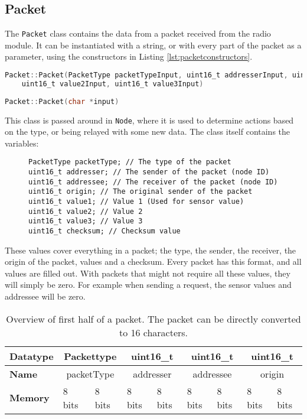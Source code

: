 \subsection{Packet}
The \texttt{Packet} class contains the data from a packet received from the radio module. It can be instantiated with a string, or with every part of the packet as a parameter, using the constructors in Listing \ref{lst:packetconstructors}.
\begin{lstlisting}[language=C,label={lst:packetconstructors},caption={Packet constructors}]
Packet::Packet(PacketType packetTypeInput, uint16_t addresserInput, uint16_t addresseeInput, uint16_t originInput, uint16_t value1Input,
	uint16_t value2Input, uint16_t value3Input)
	
Packet::Packet(char *input)
\end{lstlisting}


This class is passed around in \texttt{Node}, where it is used to determine actions based on the type, or being relayed with some new data. 
The class itself contains the variables:
\begin{figure}
\begin{lstlisting}
PacketType packetType; // The type of the packet
uint16_t addresser; // The sender of the packet (node ID)
uint16_t addressee; // The receiver of the packet (node ID)
uint16_t origin; // The original sender of the packet
uint16_t value1; // Value 1 (Used for sensor value)
uint16_t value2; // Value 2
uint16_t value3; // Value 3
uint16_t checksum; // Checksum value
\end{lstlisting}
\end{figure}
These values cover everything in a packet; the type, the sender, the receiver, the origin of the packet, values and a checksum.
Every packet has this format, and all values are filled out. With packets that might not require all these values, they will simply be zero. For example when sending a request, the sensor values and addressee will be zero.

\begin{table}[]
\centering
\begin{tabular}{|l|c|l|c|l|c|l|c|l|}
\hline
\textbf{Datatype} & \multicolumn{2}{c|}{Packettype}      & \multicolumn{2}{c|}{uint16\_t}       & \multicolumn{2}{c|}{uint16\_t}       & \multicolumn{2}{c|}{uint16\_t}       \\ \hline
\textbf{Name}     & \multicolumn{2}{c|}{packetType}      & \multicolumn{2}{c|}{addresser}       & \multicolumn{2}{c|}{addressee}       & \multicolumn{2}{c|}{origin}          \\ \hline
\textbf{Memory}   & \multicolumn{1}{l|}{8 bits} & 8 bits & \multicolumn{1}{l|}{8 bits} & 8 bits & \multicolumn{1}{l|}{8 bits} & 8 bits & \multicolumn{1}{l|}{8 bits} & 8 bits \\ \hline
\end{tabular}
\caption{Overview of first half of a packet. The packet can be directly converted to 16 characters.}
\label{tab:packetTableFirst}
\end{table}

